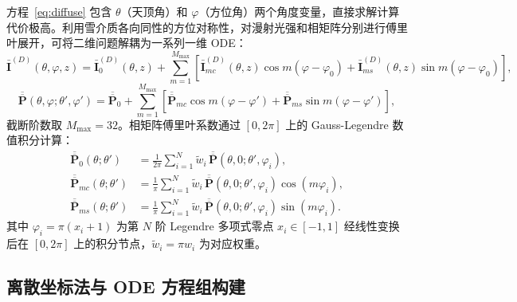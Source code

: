 \documentclass[UTF8,a4paper,12pt]{ctexart}
\begin{document}
方程~\eqref{eq:diffuse} 包含 $\theta$（天顶角）和 $\varphi$（方位角）两个角度变量，直接求解计算代价极高。利用雪介质各向同性的方位对称性，对漫射光强和相矩阵分别进行傅里叶展开，可将二维问题解耦为一系列一维 ODE：
\begin{equation}
  \bar{\mathbf{I}}^{(D)}(\theta,\varphi,z)
  = \bar{\mathbf{I}}^{(D)}_0(\theta,z)
  + \sum_{m=1}^{M_{\max}}\!\left[
      \bar{\mathbf{I}}^{(D)}_{mc}(\theta,z)\cos m(\varphi-\varphi_0)
    + \bar{\mathbf{I}}^{(D)}_{ms}(\theta,z)\sin m(\varphi-\varphi_0)
  \right],
  \label{eq:fourier-I}
\end{equation}
\begin{equation}
  \overline{\overline{\mathbf{P}}}(\theta,\varphi;\theta',\varphi')
  = \overline{\overline{\mathbf{P}}}_0
  + \sum_{m=1}^{M_{\max}}\!\left[
    \overline{\overline{\mathbf{P}}}_{mc}\cos m(\varphi-\varphi')
  + \overline{\overline{\mathbf{P}}}_{ms}\sin m(\varphi-\varphi')
  \right],
  \label{eq:fourier-P}
\end{equation}
截断阶数取 $M_{\max}=32$。相矩阵傅里叶系数通过 $[0,2\pi]$ 上的 Gauss-Legendre 数值积分计算：
\begin{align}
  \overline{\overline{\mathbf{P}}}_0(\theta;\theta')
  &= \frac{1}{2\pi}\sum_{i=1}^{N}\tilde{w}_i\,
     \overline{\overline{\mathbf{P}}}(\theta,0;\theta',\varphi_i),
  \label{eq:P0} \\
  \overline{\overline{\mathbf{P}}}_{mc}(\theta;\theta')
  &= \frac{1}{\pi}\sum_{i=1}^{N}\tilde{w}_i\,
     \overline{\overline{\mathbf{P}}}(\theta,0;\theta',\varphi_i)\cos(m\varphi_i),
  \label{eq:Pmc} \\
  \overline{\overline{\mathbf{P}}}_{ms}(\theta;\theta')
  &= \frac{1}{\pi}\sum_{i=1}^{N}\tilde{w}_i\,
     \overline{\overline{\mathbf{P}}}(\theta,0;\theta',\varphi_i)\sin(m\varphi_i).
  \label{eq:Pms}
\end{align}
其中 $\varphi_i=\pi(x_i+1)$ 为第 $N$ 阶 Legendre 多项式零点 $x_i\in[-1,1]$ 经线性变换后在 $[0,2\pi]$ 上的积分节点，$\tilde{w}_i=\pi w_i$ 为对应权重。

\subsection{离散坐标法与 ODE 方程组构建}
\end{document}

